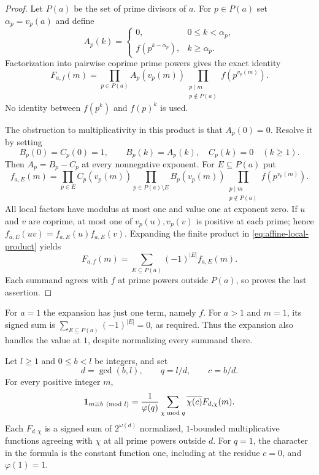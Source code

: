 \begin{proof}
Let $P(a)$ be the set of prime divisors of $a$. For $p\in P(a)$ set
$\alpha_p=v_p(a)$ and define
\begin{equation}
 A_p(k)=
 \begin{cases}
 0,&0\le k<\alpha_p,\\
 f(p^{k-\alpha_p}),&k\ge\alpha_p.
 \end{cases}
 \label{eq:affine-local-sequence}
\end{equation}
Factorization into pairwise coprime prime powers gives the exact identity
\begin{equation}
 F_{a,f}(m)=
 \prod_{p\in P(a)}A_p(v_p(m))
 \prod_{\substack{p\mid m\\p\notin P(a)}}f(p^{v_p(m)}).
 \label{eq:affine-local-product}
\end{equation}
No identity between $f(p^k)$ and $f(p)^k$ is used.

The obstruction to multiplicativity in this product is that
$A_p(0)=0$. Resolve it by setting
\begin{equation}
 B_p(0)=C_p(0)=1,\qquad
 B_p(k)=A_p(k),\quad C_p(k)=0\quad(k\ge1).
 \label{eq:affine-b-minus-c}
\end{equation}
Then $A_p=B_p-C_p$ at every nonnegative exponent. For
$E\subseteq P(a)$ put
\[
 f_{a,E}(m)=
 \prod_{p\in E}C_p(v_p(m))
 \prod_{p\in P(a)\setminus E}B_p(v_p(m))
 \prod_{\substack{p\mid m\\p\notin P(a)}}f(p^{v_p(m)}).
\]
All local factors have modulus at most one and value one at exponent
zero. If $u$ and $v$ are coprime, at most one of $v_p(u),v_p(v)$ is
positive at each prime; hence $f_{a,E}(uv)=f_{a,E}(u)f_{a,E}(v)$.
Expanding the finite product in \eqref{eq:affine-local-product} yields
\begin{equation}
 F_{a,f}(m)=
 \sum_{E\subseteq P(a)}(-1)^{|E|}f_{a,E}(m).
 \label{eq:affine-dilation-expansion}
\end{equation}
Each summand agrees with $f$ at prime powers outside $P(a)$, so
 proves the last assertion.
\end{proof}

For $a=1$ the expansion has just one term, namely $f$. For $a>1$
and $m=1$, its signed sum is
$\sum_{E\subseteq P(a)}(-1)^{|E|}=0$, as required. Thus the expansion
also handles the value at $1$, despite normalizing every summand there.

\begin{lemma}
\label{lem:affine-residue}
Let $l\ge1$ and $0\le b<l$ be integers, and set
\[
 d=\gcd(b,l),\qquad q=l/d,\qquad c=b/d.
\]
For every positive integer $m$,
\begin{equation}
 \mathbf 1_{m\equiv b\pmod l}
 =\frac1{\varphi(q)}\sum_{\chi\bmod q}
       \overline{\chi(c)}F_{d,\chi}(m).
 \label{eq:affine-character-expansion}
\end{equation}
Each $F_{d,\chi}$ is a signed sum of $2^{\omega(d)}$ normalized,
$1$-bounded multiplicative functions agreeing with $\chi$ at all prime
powers outside $d$. For $q=1$, the character in the formula is the
constant function one, including at the residue $c=0$, and
$\varphi(1)=1$.
\end{lemma}

